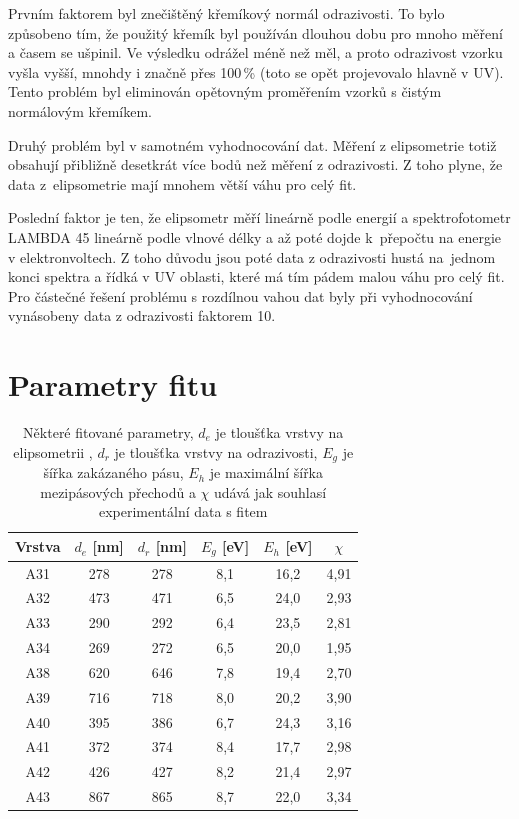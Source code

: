 \documentclass[12pt,oneside,final]{fithesis2}
\begin{document}
Prvním faktorem byl znečištěný křemíkový normál odrazivosti. To bylo způsobeno tím, že použitý křemík byl používán dlouhou dobu pro mnoho měření a časem se ušpinil. Ve výsledku odrážel méně než měl, a proto odrazivost vzorku vyšla vyšší, mnohdy i značně přes 100\,\% (toto se opět projevovalo hlavně v UV). Tento problém byl eliminován opětovným proměřením vzorků s čistým normálovým křemíkem. 

Druhý problém byl v samotném vyhodnocování dat. Měření z elipsometrie totiž obsahují přibližně desetkrát více bodů než měření z odrazivosti. Z toho plyne, že data z~elipsometrie mají mnohem větší váhu pro celý fit. 

Poslední faktor je ten, že elipsometr měří lineárně podle energií a spektrofotometr LAMBDA 45 lineárně podle vlnové délky a až poté dojde k~přepočtu na energie v elektronvoltech. Z toho důvodu jsou poté data z odrazivosti hustá na~jednom konci spektra a řídká v UV oblasti, které má tím pádem malou váhu pro celý fit. Pro částečné řešení problému s rozdílnou vahou dat byly při vyhodnocování vynásobeny data z odrazivosti faktorem 10.


\section{Parametry fitu}

\begin{table}[b]
 \centering
 \begin{tabular}{|c|c|c|c|c|c|}
  \hline
  {\bf Vrstva} & {\bf $d_e$ [nm]} & {\bf $d_r$ [nm]} & {\bf $E_g$ [eV]} & {\bf $E_h$ [eV]} & {\bf $\chi$} \\
   \hline \hline
   A31 & 278 & 278 & 8,1  & 16,2 & 4,91 \\
   A32 & 473 & 471 & 6,5  & 24,0 & 2,93 \\
   A33 & 290 & 292 & 6,4  & 23,5 & 2,81 \\
   A34 & 269 & 272 & 6,5  & 20,0 & 1,95 \\
   A38 & 620 & 646 & 7,8  & 19,4 & 2,70 \\
   A39 & 716 & 718 & 8,0  & 20,2 & 3,90 \\
   A40 & 395 & 386 & 6,7  & 24,3 & 3,16 \\
   A41 & 372 & 374 & 8,4  & 17,7 & 2,98 \\
   A42 & 426 & 427 & 8,2  & 21,4 & 2,97 \\
   A43 & 867 & 865 & 8,7  & 22,0 & 3,34 \\
  \hline
  \end{tabular}
  \caption{Některé fitované parametry, $d_e$ je tloušťka vrstvy na elipsometrii , $d_r$ je tloušťka vrstvy na odrazivosti, $E_g$ je šířka zakázaného pásu, $E_h$ je maximální šířka mezipásových přechodů a $\chi$ udává jak souhlasí experimentální data s fitem}
  \label{fitparameters}
\end{table}
\end{document}
